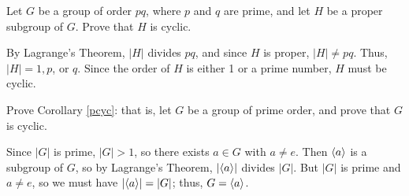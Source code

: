 \begin{exercise} Let $G$ be a group of order $pq$, where $p$
    and $q$ are prime, and let $H$ be a proper subgroup of
    $G$. Prove that $H$ is cyclic.
\end{exercise}

\begin{solution}[print=true]
By Lagrange's Theorem, $|H|$ divides $pq$, and since $H$ is proper, $|H|\neq  pq$.
    Thus, $|H|=1,p$, or $q$. Since the order of $H$ is
    either 1 or a prime number, $H$ must be cyclic.
\end{solution}

\begin{exercise} Prove Corollary \ref{pcyc}: that is, let $G$ be a group of prime order, and prove that $G$ is cyclic. \end{exercise}

\begin{solution}[print=true]
Since $|G|$ is prime, $|G|>1$, so there exists $a\in G$
with $a\neq e$. Then $\langle a\rangle$ is a subgroup of $G$, so by
Lagrange's Theorem, $|\langle a\rangle|$ divides $|G|$.  But $|G|$ is
prime and $a\neq e$, so we must have $|\langle a\rangle|=|G|$; thus,
$G=\langle a\rangle$.\end{solution}

